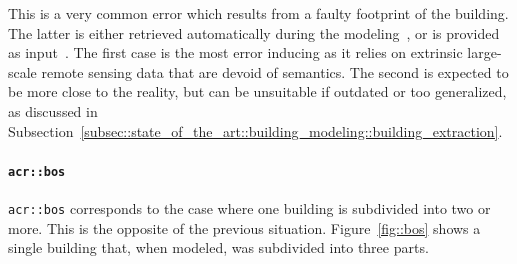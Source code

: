                 This is a very common error which results from a faulty footprint of the building.
                The latter is either retrieved automatically during the modeling~\parencite{lafarge2012creating}, or is provided as input~\parencite{durupt2006automatic}.
                The first case is the most error inducing as it relies on extrinsic large-scale remote sensing data that are devoid of semantics.
                The second is expected to be more close to the reality, but can be unsuitable if outdated or too generalized, as discussed in Subsection~\ref{subsec::state_of_the_art::building_modeling::building_extraction}.

            \paragraph{\texttt{\acrlong*{acr::bos}}}
                \texttt{\gls{acr::bos}} corresponds to the case where one building is subdivided into two or more.
                This is the opposite of the previous situation.
                Figure~\ref{fig::bos} shows a single building that, when modeled, was subdivided into three parts.\\

                \begin{figure}[htbp]
                    \centering
                \end{figure}


